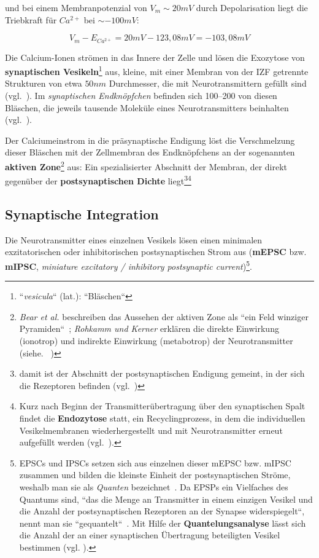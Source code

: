 {und bei einem Membranpotenzial von $V_m \sim 20 mV$ durch Depolarisation liegt die Triebkraft für $Ca^{2+}$ bei $\sim -100 mV$:

\begin{equation}
 V_m - E_{Ca^{2+}} = 20 mV - 123,08 mV = -103,08 mV
 \label{eq:gl-triebkraftca2}
\end{equation}


Die Calcium-Ionen strömen in das Innere der Zelle und lösen die Exozytose von \textbf{synaptischen Vesikeln}\footnote{
 ``\textit{vesicula}`` (lat.): ``Bläschen``
} aus, kleine, mit einer Membran von der IZF getrennte Strukturen von etwa $50 nm$ Durchmesser, die mit Neurotransmittern gefüllt sind (vgl.~\cite[1000]{BCP18}).
Im \textit{synaptischen Endknöpfchen} befinden sich 100--200 von diesen Bläschen, die jeweils tausende Moleküle eines Neurotransmitters beinhalten (vgl.~\cite[184]{KSJ+13}).

Der Calciumeinstrom in die präsynaptische Endigung löst die Verschmelzung dieser Bläschen mit der Zellmembran des Endknöpfchens an der sogenannten \textbf{aktiven Zone}\footnote{
 \textit{Bear et al.} beschreiben das Aussehen der aktiven Zone als ``ein Feld winziger Pyramiden``~\cite[123]{BCP18}; \textit{Rohkamm und Kerner} erklären die direkte Einwirkung (ionotrop) und indirekte Einwirkung (metabotrop) der Neurotransmitter (siehe. ~\cite[134]{RK18})
} aus: Ein spezialisierter Abschnitt der Membran, der direkt gegenüber der \textbf{postsynaptischen Dichte} liegt\footnote{
 damit ist der Abschnitt der postsynaptischen Endigung gemeint, in der sich die Rezeptoren befinden (vgl.~\cite[96]{HS19a})
}\footnote{
Kurz nach Beginn der Transmitterübertragung über den synaptischen Spalt findet die \textbf{Endozytose} statt, ein Recyclingprozess, in dem die individuellen Vesikelmembranen wiederhergestellt und mit Neurotransmitter erneut aufgefüllt werden (vgl.~\cite[133]{BCP18}).
}



\subsection{Synaptische Integration}

Die Neurotransmitter eines einzelnen Vesikels lösen einen minimalen exzitatorischen oder inhibitorischen postsynaptischen Strom aus (\textbf{mEPSC} bzw. \textbf{mIPSC}, \textit{miniature excitatory / inhibitory postsynaptic current})\footnote{
EPSCs und IPSCs setzen sich aus einzelnen dieser mEPSC bzw. mIPSC zusammen und bilden die kleinste Einheit der postsynaptischen Ströme, weshalb man sie als \textit{Quanten} bezeichnet~\cite[98]{HS19a}.
Da EPSPs ein Vielfaches des Quantums sind, ``das die Menge an Transmitter in einem einzigen Vesikel und die Anzahl der postsynaptischen Rezeptoren an der Synapse widerspiegelt``, nennt man sie ``gequantelt``~\cite[142]{BCP18}. Mit Hilfe der \textbf{Quantelungsanalyse} lässt sich die Anzahl der an einer synaptischen Übertragung beteiligten Vesikel bestimmen (vgl. \cite[142]{BCP18}).
}.

}

